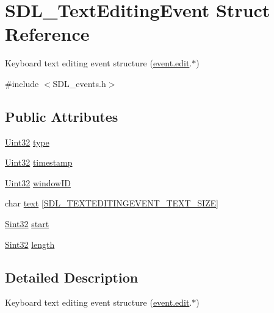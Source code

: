 \hypertarget{struct_s_d_l___text_editing_event}{}\section{S\+D\+L\+\_\+\+Text\+Editing\+Event Struct Reference}
\label{struct_s_d_l___text_editing_event}


Keyboard text editing event structure (\hyperlink{union_s_d_l___event_a9a7e3b67b2654d4c5fc509676c6a7183}{event.\+edit}.$\ast$)  




{\ttfamily \#include $<$S\+D\+L\+\_\+events.\+h$>$}

\subsection*{Public Attributes}
\begin{DoxyCompactItemize}
\item 
\hyperlink{_s_d_l__stdinc_8h_add440eff171ea5f55cb00c4a9ab8672d}{Uint32} \hyperlink{struct_s_d_l___text_editing_event_a198e6df194a3bf12cf5f82553e84c7cb}{type}
\item 
\hyperlink{_s_d_l__stdinc_8h_add440eff171ea5f55cb00c4a9ab8672d}{Uint32} \hyperlink{struct_s_d_l___text_editing_event_afc164f40abee6fd8e72e01b589210c75}{timestamp}
\item 
\hyperlink{_s_d_l__stdinc_8h_add440eff171ea5f55cb00c4a9ab8672d}{Uint32} \hyperlink{struct_s_d_l___text_editing_event_a23b3e414cf7a7ccc547b7595ca930049}{window\+ID}
\item 
char \hyperlink{struct_s_d_l___text_editing_event_a29848c2e7819ea98ae8fb08543e6d420}{text} \mbox{[}\hyperlink{_s_d_l__events_8h_a2399de7b94f0570b853f5da9c5db7e82}{S\+D\+L\+\_\+\+T\+E\+X\+T\+E\+D\+I\+T\+I\+N\+G\+E\+V\+E\+N\+T\+\_\+\+T\+E\+X\+T\+\_\+\+S\+I\+ZE}\mbox{]}
\item 
\hyperlink{_s_d_l__stdinc_8h_a7a90b941db9d4582e9ad7abb9940ff7e}{Sint32} \hyperlink{struct_s_d_l___text_editing_event_ac6c6a00835d92b12c0ba5b78b5ad676d}{start}
\item 
\hyperlink{_s_d_l__stdinc_8h_a7a90b941db9d4582e9ad7abb9940ff7e}{Sint32} \hyperlink{struct_s_d_l___text_editing_event_adca95505c0bf212834930df58f6d1aa5}{length}
\end{DoxyCompactItemize}


\subsection{Detailed Description}
Keyboard text editing event structure (\hyperlink{union_s_d_l___event_a9a7e3b67b2654d4c5fc509676c6a7183}{event.\+edit}.$\ast$) 

